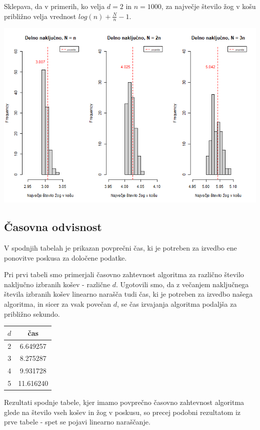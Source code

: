 \documentclass[a4paper, 11pt]{article}
\begin{document}
Sklepava, da v primerih, ko velja $d = 2$ in $n = 1000$, za največje število žog v košu približno
velja vrednost $log(n) + \frac{N}{n} -1$. 

\includegraphics[scale=0.60]{delno_nakljucno2.png}

\subsection{Časovna odvisnost}

V spodnjih tabelah je prikazan povprečni čas, ki je potreben za izvedbo ene ponovitve poskusa za določene podatke. 

Pri prvi tabeli smo primerjali časovno zahtevnost algoritma za različno število naključno izbranih košev - različne $d$. 
Ugotovili smo, da z večanjem naključnega števila izbranih košev linearno narašča tudi čas, 
ki je potreben za izvedbo našega algoritma, in sicer za vsak povečan $d$, se čas izvajanja algoritma podaljša za približno sekundo.

\begin{center}
    \begin{tabular}{|c|c|}
        \hline
        $d$ & čas \\
        \hline
        2 & 6.649257 \\
        \hline
        3 & 8.275287 \\
        \hline
        4 & 9.931728 \\
        \hline
        5 & 11.616240 \\ 
        \hline
    \end{tabular}
\end{center}

Rezultati spodnje tabele, kjer imamo povprečno časovno zahtevnost algoritma glede na število vseh košev in žog v poskusu, so precej podobni rezultatom iz prve tabele - spet se pojavi linearno naraščanje. 
\end{document}
